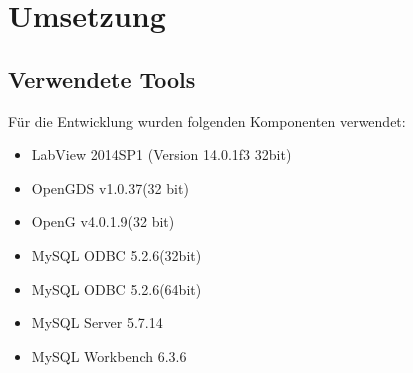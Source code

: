 \documentclass[10pt]{scrartcl}
\begin{document}
\section{Umsetzung}
\subsection{Verwendete Tools}
Für die Entwicklung wurden folgenden Komponenten verwendet:
\begin{itemize}
	\item LabView 2014SP1 (Version 14.0.1f3 32bit)
	\item OpenGDS v1.0.37(32 bit)
	\item OpenG v4.0.1.9(32 bit)
	\item MySQL ODBC 5.2.6(32bit)
	\item MySQL ODBC 5.2.6(64bit)
	\item MySQL Server 5.7.14
	\item MySQL Workbench 6.3.6
\end{itemize}
\end{document}
